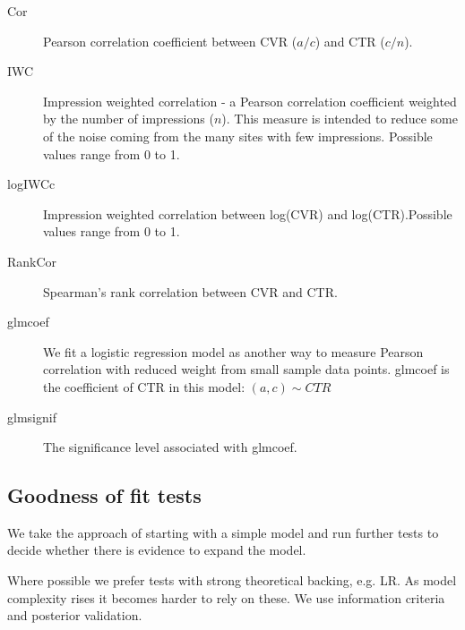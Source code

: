 \documentclass[11pt,a4,singlespacing,titlepagenumber=on]{scrreprt}
\numberwithin{equation}{chapter} %
\theoremstyle{remark}
\begin{document}
\begin{description}
	\item[Cor] Pearson correlation coefficient between CVR ($a/c$) and CTR ($c/n$).
	\item[IWC] Impression weighted correlation - a Pearson correlation coefficient weighted by the number of impressions ($n$). This measure is intended to reduce some of the noise coming from the many sites with few impressions. Possible values range from 0 to 1.
	\item[logIWCc] Impression weighted correlation between log(CVR) and log(CTR).Possible values range from 0 to 1.
	\item[RankCor] Spearman's rank correlation between CVR and CTR.
	\item[glmcoef] We fit a logistic regression model as another way to measure Pearson correlation with reduced weight from small sample data points. glmcoef is the coefficient of CTR in this model:
	$(a,c) \sim CTR$ 
	\item[glmsignif] The significance level associated with glmcoef.
\end{description}


\subsection{Goodness of fit tests}

We take the approach of starting with a simple model and run further tests to decide whether there is evidence to expand the model. 

Where possible we prefer tests with strong theoretical backing, e.g. LR. As model complexity rises it becomes harder to rely on these. We use information criteria and posterior validation.
\end{document}
